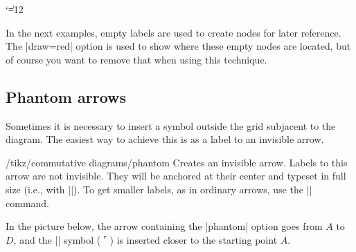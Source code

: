 \documentclass[a4paper]{ltxdoc}
\begin{document}
{\catcode`\|=12
\begin{codeexample}[]
\end{codeexample}
}

In the next examples, empty labels are used to create nodes for later
reference.  The |draw=red| option is used to show where these empty
nodes are located, but of course you want to remove that when using
this technique.

\begin{codeexample}[]
\end{codeexample}

\begin{codeexample}[]
\end{codeexample}

\subsection{Phantom arrows}
\label{sec:phantom-arrows}

Sometimes it is necessary to insert a symbol outside the grid
subjacent to the diagram.  The easiest way to achieve this is as a
label to an invisible arrow.

\begin{stylekey}{/tikz/commutative diagrams/phantom}
  Creates an invisible arrow.  Labels to this arrow are not invisible.
  They will be anchored at their center and typeset in full size
  (i.e., with |\textstyle|).  To get smaller labels, as in ordinary
  arrows, use the |\scriptstyle| command.
\end{stylekey}

In the picture below, the arrow containing the |phantom| option goes from
$A$ to $D$, and the |\ulcorner| symbol ($\ulcorner$) is inserted
closer to the starting point $A$.
\begin{codeexample}[]
\end{codeexample}
\end{document}
